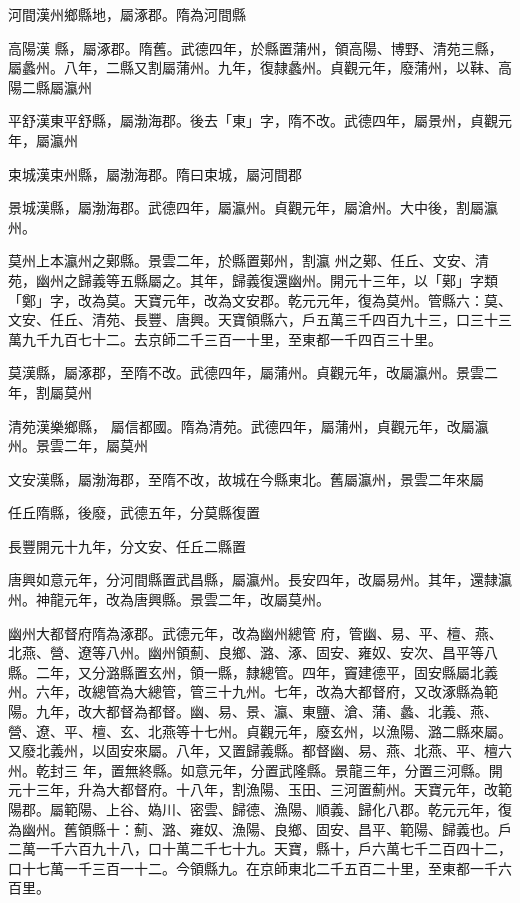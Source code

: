 \begin{pinyinscope}
 河間漢州鄉縣地，屬涿郡。隋為河間縣



 高陽漢
 縣，屬涿郡。隋舊。武德四年，於縣置蒲州，領高陽、博野、清苑三縣，屬蠡州。八年，二縣又割屬蒲州。九年，復隸蠡州。貞觀元年，廢蒲州，以靺、高陽二縣屬瀛州



 平舒漢東平舒縣，屬渤海郡。後去「東」字，隋不改。武德四年，屬景州，貞觀元年，屬瀛州



 束城漢束州縣，屬渤海郡。隋曰束城，屬河間郡



 景城漢縣，屬渤海郡。武德四年，屬瀛州。貞觀元年，屬滄州。大中後，割屬瀛州。



 莫州上本瀛州之鄚縣。景雲二年，於縣置鄚州，割瀛
 州之鄚、任丘、文安、清苑，幽州之歸義等五縣屬之。其年，歸義復還幽州。開元十三年，以「鄚」字類「鄭」字，改為莫。天寶元年，改為文安郡。乾元元年，復為莫州。管縣六：莫、文安、任丘、清苑、長豐、唐興。天寶領縣六，戶五萬三千四百九十三，口三十三萬九千九百七十二。去京師二千三百一十里，至東都一千四百三十里。



 莫漢縣，屬涿郡，至隋不改。武德四年，屬蒲州。貞觀元年，改屬瀛州。景雲二年，割屬莫州



 清苑漢樂鄉縣，
 屬信都國。隋為清苑。武德四年，屬蒲州，貞觀元年，改屬瀛州。景雲二年，屬莫州



 文安漢縣，屬渤海郡，至隋不改，故城在今縣東北。舊屬瀛州，景雲二年來屬



 任丘隋縣，後廢，武德五年，分莫縣復置



 長豐開元十九年，分文安、任丘二縣置



 唐興如意元年，分河間縣置武昌縣，屬瀛州。長安四年，改屬易州。其年，還隸瀛州。神龍元年，改為唐興縣。景雲二年，改屬莫州。



 幽州大都督府隋為涿郡。武德元年，改為幽州總管
 府，管幽、易、平、檀、燕、北燕、營、遼等八州。幽州領薊、良鄉、潞、涿、固安、雍奴、安次、昌平等八縣。二年，又分潞縣置玄州，領一縣，隸總管。四年，竇建德平，固安縣屬北義州。六年，改總管為大總管，管三十九州。七年，改為大都督府，又改涿縣為範陽。九年，改大都督為都督。幽、易、景、瀛、東鹽、滄、蒲、蠡、北義、燕、營、遼、平、檀、玄、北燕等十七州。貞觀元年，廢玄州，以漁陽、潞二縣來屬。又廢北義州，以固安來屬。八年，又置歸義縣。都督幽、易、燕、北燕、平、檀六州。乾封三
 年，置無終縣。如意元年，分置武隆縣。景龍三年，分置三河縣。開元十三年，升為大都督府。十八年，割漁陽、玉田、三河置薊州。天寶元年，改範陽郡。屬範陽、上谷、媯川、密雲、歸德、漁陽、順義、歸化八郡。乾元元年，復為幽州。舊領縣十：薊、潞、雍奴、漁陽、良鄉、固安、昌平、範陽、歸義也。戶二萬一千六百九十八，口十萬二千七十九。天寶，縣十，戶六萬七千二百四十二，口十七萬一千三百一十二。今領縣九。在京師東北二千五百二十里，至東都一千六
 百里。




\end{pinyinscope}
